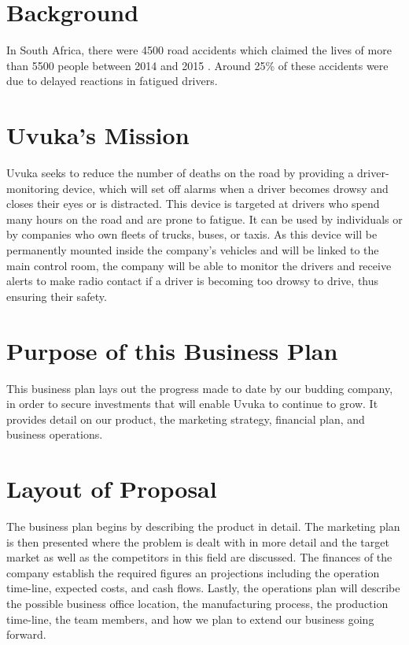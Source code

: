 \section{Background}
In South Africa, there were 4500 road accidents which claimed the lives of more than 5500 people between 2014 and 2015 \cite{EWNRoadDeaths}. Around 25\% of these accidents were due to delayed reactions in fatigued drivers.

\section{Uvuka's Mission}
Uvuka seeks to reduce the number of deaths on the road by providing a driver-monitoring device, which will set off alarms when a driver becomes drowsy and closes their eyes or is distracted. This device is targeted at drivers who spend many hours on the road and are prone to fatigue. It can be used by individuals or by companies who own fleets of trucks, buses, or taxis. As this device will be permanently mounted inside the company's vehicles and will be linked to the main control room, the company will be able to monitor the drivers and receive alerts to make radio contact if a driver is becoming too drowsy to drive, thus ensuring their safety.

\section{Purpose of this Business Plan}
This business plan lays out the progress made to date by our budding company, in order to secure investments that will enable Uvuka to continue to grow. It provides detail on our product, the marketing strategy, financial plan, and business operations.

\section{Layout of Proposal}
The business plan begins by describing the product in detail. The marketing plan is then presented where the problem is dealt with in more detail and the target market as well as the competitors in this field are discussed. The finances of the company establish the required figures an projections including the operation time-line, expected costs, and cash flows. Lastly, the operations plan will describe the possible business office location, the manufacturing process, the production time-line, the team members, and how we plan to extend our business going forward.

